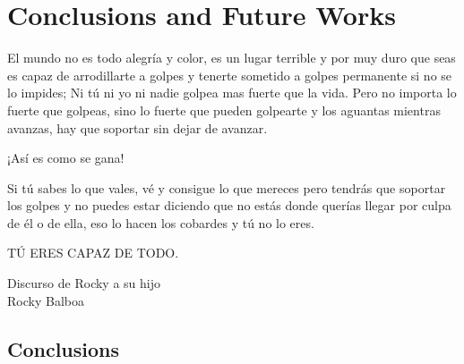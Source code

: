 % 
% 
% 
% 
% 
% 
% 

\chapter{Conclusions and Future Works}
\label{cha:conclusions_and_future_works}

\begin{FraseCelebre}
	\begin{Frase}
		El mundo no es todo alegría y color, es un lugar terrible y por muy duro que seas es capaz de arrodillarte a golpes y tenerte sometido a golpes permanente si no se lo impides; Ni tú ni yo ni nadie golpea mas fuerte que la vida. Pero no importa lo fuerte que golpeas, sino lo fuerte que pueden golpearte y los aguantas mientras avanzas, hay que soportar sin dejar de avanzar.
		
		¡Así es como se gana!
		
		Si tú sabes lo que vales, vé y consigue lo que mereces pero tendrás que soportar los golpes y no puedes estar diciendo que no estás donde querías llegar por culpa de él o de ella, eso lo hacen los cobardes y tú no lo eres.
		
		TÚ ERES CAPAZ DE TODO.
	\end{Frase}
	\begin{Fuente}
		Discurso de Rocky a su hijo \\
		Rocky Balboa
	\end{Fuente}
\end{FraseCelebre}

\section{Conclusions}
\label{sec:6_introduction}

